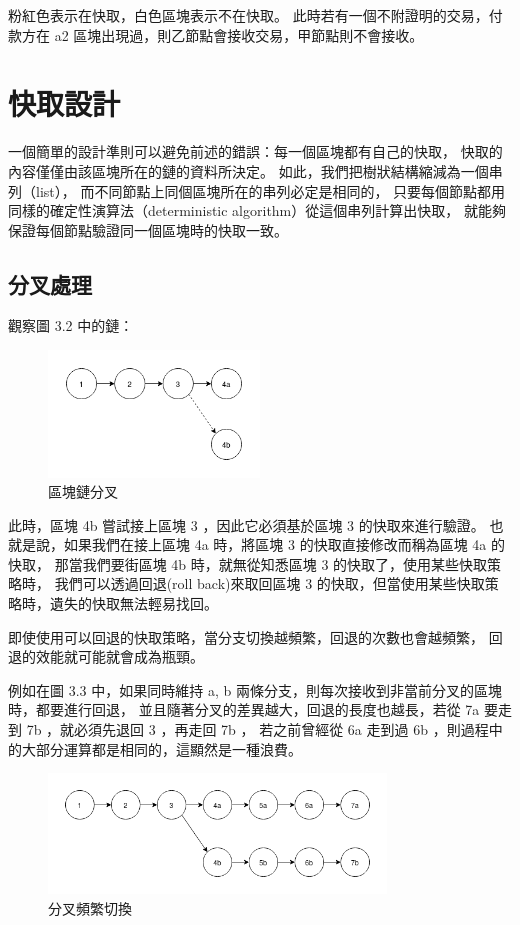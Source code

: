 粉紅色表示在快取，白色區塊表示不在快取。
此時若有一個不附證明的交易，付款方在 a2 區塊出現過，則乙節點會接收交易，甲節點則不會接收。

\section{快取設計}

一個簡單的設計準則可以避免前述的錯誤：每一個區塊都有自己的快取，
快取的內容僅僅由該區塊所在的鏈的資料所決定。
如此，我們把樹狀結構縮減為一個串列（list），
而不同節點上同個區塊所在的串列必定是相同的，
只要每個節點都用同樣的確定性演算法（deterministic algorithm）從這個串列計算出快取，
就能夠保證每個節點驗證同一個區塊時的快取一致。

\subsection{分叉處理}

觀察圖 3.2 中的鏈：

\begin{figure}[ht]
\centerline{\includegraphics[width=0.5\textwidth]{快取分叉}}
\caption{區塊鏈分叉}
\end{figure}

此時，區塊 4b 嘗試接上區塊 3 ，因此它必須基於區塊 3 的快取來進行驗證。
也就是說，如果我們在接上區塊 4a 時，將區塊 3 的快取直接修改而稱為區塊 4a 的快取，
那當我們要街區塊 4b 時，就無從知悉區塊 3 的快取了，使用某些快取策略時，
我們可以透過回退(roll back)來取回區塊 3 的快取，但當使用某些快取策略時，遺失的快取無法輕易找回。

即使使用可以回退的快取策略，當分支切換越頻繁，回退的次數也會越頻繁，
回退的效能就可能就會成為瓶頸。

例如在圖 3.3 中，如果同時維持 a, b 兩條分支，則每次接收到非當前分叉的區塊時，都要進行回退，
並且隨著分叉的差異越大，回退的長度也越長，若從 7a 要走到 7b ，就必須先退回 3 ，再走回 7b ，
若之前曾經從 6a 走到過 6b ，則過程中的大部分運算都是相同的，這顯然是一種浪費。

\begin{figure}[h!]
\centerline{\includegraphics[width=0.8\textwidth]{快取長分叉}}
\caption{分叉頻繁切換}
\end{figure}

